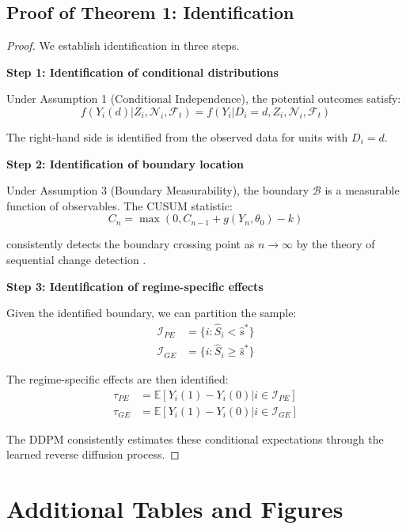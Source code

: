 \subsection{Proof of Theorem 1: Identification}

\begin{proof}
We establish identification in three steps.

\textbf{Step 1: Identification of conditional distributions}

Under Assumption 1 (Conditional Independence), the potential outcomes satisfy:
\begin{equation}
f(Y_i(d) | Z_i, \mathcal{N}_i, \mathcal{F}_t) = f(Y_i | D_i = d, Z_i, \mathcal{N}_i, \mathcal{F}_t)
\end{equation}

The right-hand side is identified from the observed data for units with $D_i = d$.

\textbf{Step 2: Identification of boundary location}

Under Assumption 3 (Boundary Measurability), the boundary $\mathcal{B}$ is a measurable function of observables. The CUSUM statistic:
\begin{equation}
C_n = \max(0, C_{n-1} + g(Y_n, \theta_0) - k)
\end{equation}

consistently detects the boundary crossing point as $n \to \infty$ by the theory of sequential change detection \citep{lorden1971procedures}.

\textbf{Step 3: Identification of regime-specific effects}

Given the identified boundary, we can partition the sample:
\begin{align}
\mathcal{I}_{PE} &= \{i : \hat{S}_i < \hat{s}^*\} \\
\mathcal{I}_{GE} &= \{i : \hat{S}_i \geq \hat{s}^*\}
\end{align}

The regime-specific effects are then identified:
\begin{align}
\tau_{PE} &= \mathbb{E}[Y_i(1) - Y_i(0) | i \in \mathcal{I}_{PE}] \\
\tau_{GE} &= \mathbb{E}[Y_i(1) - Y_i(0) | i \in \mathcal{I}_{GE}]
\end{align}

The DDPM consistently estimates these conditional expectations through the learned reverse diffusion process.
\end{proof}

\section{Additional Tables and Figures}


